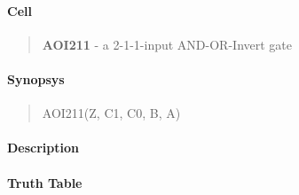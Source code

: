 \label{AOI211}
\paragraph{Cell}
\begin{quote}
    \textbf{AOI211} - a 2-1-1-input AND-OR-Invert gate
\end{quote}

\paragraph{Synopsys}
\begin{quote}
    AOI211(Z, C1, C0, B, A)
\end{quote}

\paragraph{Description}



\paragraph{Truth Table}


